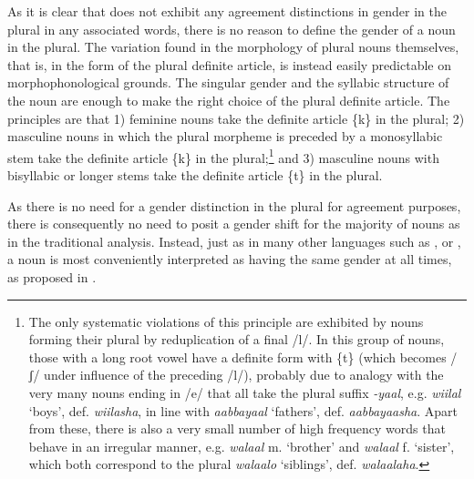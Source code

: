 \documentclass[output=paper]{langsci/langscibook}
\begin{document}
\newpage 
As it is clear that  does not exhibit any agreement distinctions in gender in the plural in any associated words, there is no reason to define the gender of a noun in the plural. The variation found in the morphology of plural nouns themselves, that is, in the form of the plural definite article, is instead easily predictable on morphophonological grounds. The singular gender and the syllabic structure of the noun are enough to make the right choice of the plural definite article. The principles are that 1) feminine nouns take the definite article \{k\} in the plural; 2) masculine nouns in which the plural morpheme is preceded by a monosyllabic stem take the definite article \{k\} in the plural;\footnote{The only systematic violations of this principle are exhibited by nouns forming their plural by reduplication of a final /l/. In this group of nouns, those with a long root vowel have a definite form with \{t\} (which becomes /ʃ/ under influence of the preceding /l/), probably due to analogy with the very many nouns ending in /e/ that all take the plural suffix \textit{-yaal}, e.g. \textit{wiilal} ‘boys’, def. \textit{wiilasha}, in line with \textit{aabbayaal} ‘fathers’, def. \textit{aabbayaasha}. Apart from these, there is also a very small number of high frequency words that behave in an irregular manner, e.g. \textit{walaal} m. ‘brother’ and \textit{walaal} f. ‘sister’, which both correspond to the plural \textit{walaalo} ‘siblings’, def. \textit{walaalaha}.} and 3) masculine nouns with bisyllabic or longer stems take the definite article \{t\} in the plural.

As there is no need for a gender distinction in the plural for agreement purposes, there is consequently no need to posit a gender shift for the majority of nouns as in the traditional analysis. Instead, just as in many other languages such as ,  or , a noun is most conveniently interpreted as having the same gender at all times, as proposed in . 
 
\end{document}
